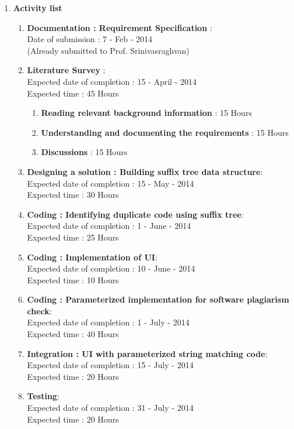 \documentclass[11pt]{article}
\begin{document}
\begin{enumerate}
  \item \textbf{Activity list}
  \begin{enumerate}
    \item \textbf{Documentation : Requirement Specification} :  \\
    Date of submission : 7 - Feb - 2014 \\ 
    (Already submitted to Prof. Srinivasraghvan)\\
    
    \item \textbf{Literature Survey} : \\
Expected date of completion : 15 - April - 2014 \\ 
Expected time : 45 Hours

\begin{enumerate}
\item \textbf{Reading relevant background information} : 15 Hours
\item \textbf{Understanding and documenting the requirements} : 15 Hours
\item \textbf{Discussions} : 15 Hours\\
\end{enumerate}

    \item \textbf{Designing a solution : Building suffix tree data structure}:\\
    Expected date of completion : 15 - May - 2014 \\ 
    Expected time : 30 Hours\\
    \item \textbf{Coding : Identifying duplicate code using suffix tree}: \\
    Expected date of completion : 1 - June - 2014 \\ 
    Expected time : 25 Hours\\
    \item \textbf{Coding : Implementation of UI}: \\
    Expected date of completion : 10 - June - 2014 \\ 
    Expected time : 10 Hours\\
    \item \textbf{Coding : Parameterized implementation for software plagiarism check}:\\
    Expected date of completion : 1 - July - 2014 \\ 
    Expected time : 40 Hours\\
    \item \textbf{Integration : UI with parameterized string matching code}:\\
    Expected date of completion : 15 - July - 2014 \\ 
    Expected time : 20 Hours\\
    \item \textbf{Testing}:\\
    Expected date of completion : 31 - July - 2014 \\ 
    Expected time : 20 Hours\\
           

\end{enumerate}
\end{enumerate}
\end{document}
